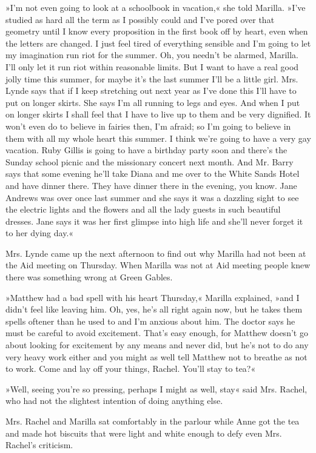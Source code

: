 »I'm not even going to look at a schoolbook in vacation,« she told Marilla. »I've studied as hard all the term as I possibly could and I've pored over that geometry until I know every proposition in the first book off by heart, even when the letters are changed. I just feel tired of everything sensible and I'm going to let my imagination run riot for the summer. Oh, you needn't be alarmed, Marilla. I'll only let it run riot within reasonable limits. But I want to have a real good jolly time this summer, for maybe it's the last summer I'll be a little girl. Mrs. Lynde says that if I keep stretching out next year as I've done this I'll have to put on longer skirts. She says I'm all running to legs and eyes. And when I put on longer skirts I shall feel that I have to live up to them and be very dignified. It won't even do to believe in fairies then, I'm afraid; so I'm going to believe in them with all my whole heart this summer. I think we're going to have a very gay vacation. Ruby Gillis is going to have a birthday party soon and there's the Sunday school picnic and the missionary concert next month. And Mr. Barry says that some evening he'll take Diana and me over to the White Sands Hotel and have dinner there. They have dinner there in the evening, you know. Jane Andrews was over once last summer and she says it was a dazzling sight to see the electric lights and the flowers and all the lady guests in such beautiful dresses. Jane says it was her first glimpse into high life and she'll never forget it to her dying day.«

Mrs. Lynde came up the next afternoon to find out why Marilla had not been at the Aid meeting on Thursday. When Marilla was not at Aid meeting people knew there was something wrong at Green Gables.

»Matthew had a bad spell with his heart Thursday,« Marilla explained, »and I didn't feel like leaving him. Oh, yes, he's all right again now, but he takes them spells oftener than he used to and I'm anxious about him. The doctor says he must be careful to avoid excitement. That's easy enough, for Matthew doesn't go about looking for excitement by any means and never did, but he's not to do any very heavy work either and you might as well tell Matthew not to breathe as not to work. Come and lay off your things, Rachel. You'll stay to tea?«

»Well, seeing you're so pressing, perhaps I might as well, stay« said Mrs. Rachel, who had not the slightest intention of doing anything else.

Mrs. Rachel and Marilla sat comfortably in the parlour while Anne got the tea and made hot biscuits that were light and white enough to defy even Mrs. Rachel's criticism.

